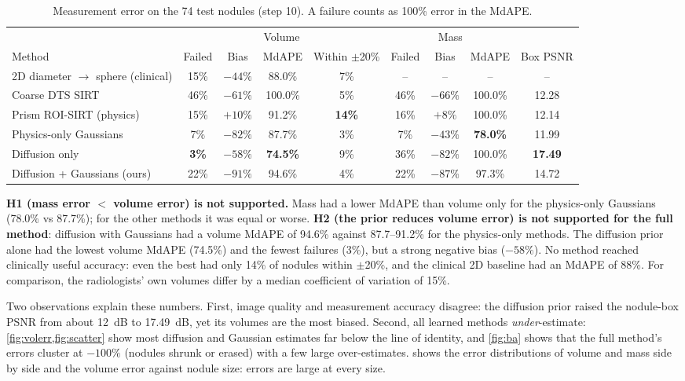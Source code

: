 \begin{table}[!htbp]
\centering\small
\caption{Measurement error on the 74 test nodules (step 10). A failure counts as 100\% error in the MdAPE.}
\label{tab:accuracy}
\begin{adjustbox}{max width=\linewidth}
\begin{tabular}{l cccc ccc c}
\toprule
 & \multicolumn{4}{c}{Volume} & \multicolumn{3}{c}{Mass} & \\
\cmidrule(lr){2-5}\cmidrule(lr){6-8}
Method & Failed & Bias & MdAPE & Within $\pm$20\% & Failed & Bias & MdAPE & Box PSNR \\
\midrule
2D diameter $\rightarrow$ sphere (clinical) & 15\% & $-44\%$ & 88.0\% & 7\% & -- & -- & -- & -- \\
Coarse DTS SIRT & 46\% & $-61\%$ & 100.0\% & 5\% & 46\% & $-66\%$ & 100.0\% & 12.28 \\
Prism ROI-SIRT (physics) & 15\% & $+10\%$ & 91.2\% & \textbf{14\%} & 16\% & $+8\%$ & 100.0\% & 12.14 \\
Physics-only Gaussians & 7\% & $-82\%$ & 87.7\% & 3\% & 7\% & $-43\%$ & \textbf{78.0\%} & 11.99 \\
Diffusion only & \textbf{3\%} & $-58\%$ & \textbf{74.5\%} & 9\% & 36\% & $-82\%$ & 100.0\% & \textbf{17.49} \\
Diffusion + Gaussians (ours) & 22\% & $-91\%$ & 94.6\% & 4\% & 22\% & $-87\%$ & 97.3\% & 14.72 \\
\bottomrule
\end{tabular}
\end{adjustbox}
\end{table}

\textbf{H1 (mass error $<$ volume error) is not supported.} Mass had a lower MdAPE than volume only for the physics-only Gaussians (78.0\% vs 87.7\%); for the other methods it was equal or worse. \textbf{H2 (the prior reduces volume error) is not supported for the full method}: diffusion with Gaussians had a volume MdAPE of 94.6\% against 87.7--91.2\% for the physics-only methods. The diffusion prior alone had the lowest volume MdAPE (74.5\%) and the fewest failures (3\%), but a strong negative bias ($-58\%$). No method reached clinically useful accuracy: even the best had only 14\% of nodules within $\pm$20\%, and the clinical 2D baseline had an MdAPE of 88\%. For comparison, the radiologists' own volumes differ by a median coefficient of variation of 15\%.

Two observations explain these numbers. First, image quality and measurement accuracy disagree: the diffusion prior raised the nodule-box PSNR from about 12~dB to 17.49~dB, yet its volumes are the most biased. Second, all learned methods \emph{under}-estimate: \cref{fig:volerr,fig:scatter} show most diffusion and Gaussian estimates far below the line of identity, and \cref{fig:ba} shows that the full method's errors cluster at $-100\%$ (nodules shrunk or erased) with a few large over-estimates.  shows the error distributions of volume and mass side by side and the volume error against nodule size: errors are large at every size.

